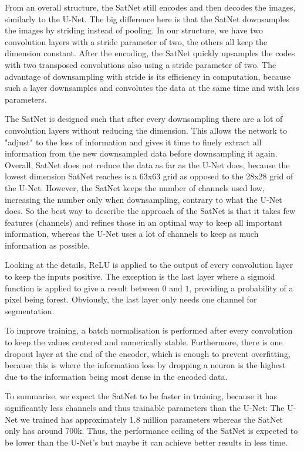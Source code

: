 From an overall structure, the SatNet still encodes and then decodes the images, similarly to the U-Net. The big difference here is that the SatNet downsamples the images by striding instead of pooling. In our structure, we have two convolution layers with a stride parameter of two, the others all keep the dimension constant. After the encoding, the SatNet quickly upsamples the codes with two transposed convolutions also using a stride parameter of two. The advantage of downsampling with stride is its efficiency in computation, because such a layer downsamples and convolutes the data at the same time and with less parameters.

The SatNet is designed such that after every downsampling there are a lot of convolution layers without reducing the dimension. This allows the network to "adjust" to the loss of information and gives it time to finely extract all information from the new downsampled data before downsampling it again. Overall, SatNet does not reduce the data as far as the U-Net does, because the lowest dimension SatNet reaches is a 63x63 grid as opposed to the 28x28 grid of the U-Net. However, the SatNet keeps the number of channels used low, increasing the number only when downsampling, contrary to what the U-Net does. So the best way to describe the approach of the SatNet is that it takes few features (channels) and refines those in an optimal way to keep all important information, whereas the U-Net uses a lot of channels to keep as much information as possible.

Looking at the details, ReLU is applied to the output of every convolution layer to keep the inputs positive. The exception is the last layer where a sigmoid function is applied to give a result between $0$ and $1$, providing a probability of a pixel being forest. Obviously, the last layer only needs one channel for segmentation.

To improve training, a batch normalisation is performed after every convolution to keep the values centered and numerically stable. Furthermore, there is one dropout layer at the end of the encoder, which is enough to prevent overfitting, because this is where the information loss by dropping a neuron is the highest due to the information being most dense in the encoded data.

To summarise, we expect the SatNet to be faster in training, because it has significantly less channels and thus trainable parameters than the U-Net: The U-Net we trained has approximately 1.8 million parameters whereas the SatNet only has around 700k. Thus, the performance ceiling of the SatNet is expected to be lower than the U-Net's but maybe it can achieve better results in less time. \\

